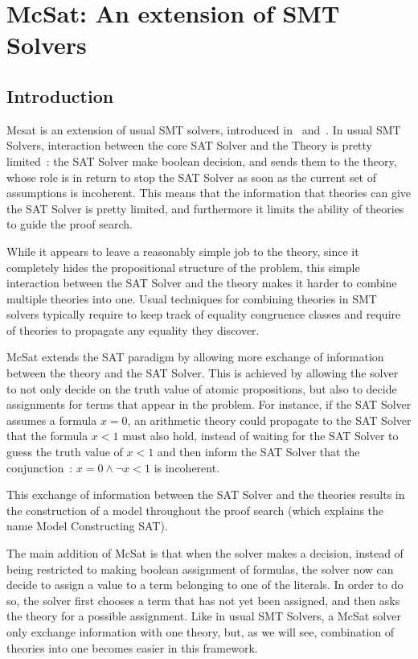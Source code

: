 \documentclass{article}
\begin{document}
\section{McSat: An extension of SMT Solvers}

\subsection{Introduction}


Mcsat is an extension of usual SMT solvers, introduced in~\cite{VMCAI13} and~\cite{FMCAD13}.
In usual SMT Solvers, interaction between the core SAT Solver and the Theory is pretty limited~:
the SAT Solver make boolean decision, and sends them to the theory, whose role is in return to
stop the SAT Solver as soon as the current set of assumptions is incoherent. This means
that the information that theories can give the SAT Solver is pretty limited, and furthermore
it limits the ability of theories to guide the proof search.

While it appears to leave a reasonably simple job to the theory, since it completely
hides the propositional structure of the problem, this simple interaction between the
SAT Solver and the theory makes it harder to combine multiple theories into one. Usual
techniques for combining theories in SMT solvers typically require to keep track of
equality congruence classes and require of theories to propagate any equality they discover.

McSat extends the SAT paradigm by allowing more exchange of information between the theory
and the SAT Solver. This is achieved by allowing the solver to not only decide on the truth value
of atomic propositions, but also to decide assignments for terms that appear in the problem.
For instance, if the SAT Solver assumes a formula $x = 0$,
an arithmetic theory could propagate to the SAT Solver that the formula $x < 1$ must also hold,
instead of waiting for the SAT Solver to guess the truth value of $x < 1$ and then
inform the SAT Solver that the conjunction~: $x = 0 \land \neg x < 1$ is incoherent.

This exchange of information between the SAT Solver and the theories results in
the construction of a model throughout the proof search (which explains the name
Model Constructing SAT).

The main addition of McSat is that when the solver makes a decision, instead of
being restricted to making boolean assignment of formulas, the solver now can
decide to assign a value to a term belonging to one of the literals. In order to do so,
the solver first chooses a term that has not yet been assigned, and then asks
the theory for a possible assignment. Like in usual SMT Solvers, a McSat solver
only exchange information with one theory, but, as we will see, combination
of theories into one becomes easier in this framework.
\end{document}
